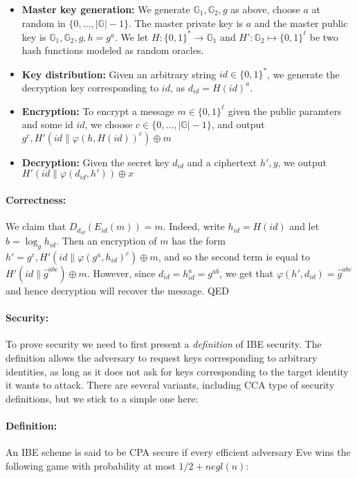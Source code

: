 \begin{itemize}
\item
  \textbf{Master key generation:} We generate
  \(\mathbb{G}_1,\mathbb{G}_2,g\) as above, choose \(a\) at random in
  \(\{0,\ldots,|\mathbb{G}|-1\}\). The master private key is \(a\) and
  the master public key is \(\mathbb{G}_1,\mathbb{G}_2,g,h=g^a\). We let
  \(H:\{0,1\}^*\rightarrow\mathbb{G}_1\) and
  \(H':\mathbb{G}_2\mapsto\{0,1\}^\ell\) be two hash functions modeled
  as random oracles.
\item
  \textbf{Key distribution:} Given an arbitrary string
  \(id\in\{0,1\}^*\), we generate the decryption key corresponding to
  \(id\), as \(d_{id} = H(id)^a\).
\item
  \textbf{Encryption:} To encrypt a message \(m\in\{0,1\}^\ell\) given
  the public paramters and some id \(id\), we choose
  \(c\in \{0,\ldots,|\mathbb{G}|-1\}\), and output
  \(g^c,H'(id\|\varphi(h,H(id))^c) \oplus m\)
\item
  \textbf{Decryption:} Given the secret key \(d_{id}\) and a ciphertext
  \(h',y\), we output \(H'(id\|\varphi(d_{id},h'))\oplus x\)
\end{itemize}

\paragraph{Correctness:} We claim that \(D_{d_{id}}(E_{id}(m))=m\).
Indeed, write \(h_{id}=H(id)\) and let \(b=\log_g h_{id}\). Then an
encryption of \(m\) has the form
\(h'=g^c, H'(id\|\varphi(g^a,h_{id})^c) \oplus m\), and so the second
term is equal to \(H'(id\|\hat{g}^{abc}) \oplus m\). However, since
\(d_{id}= h_{id}^a = g^{ab}\), we get that
\(\varphi(h',d_{id})=\hat{g}^{abc}\) and hence decryption will recover
the message. QED

\paragraph{Security:} To prove security we need to first present a
\emph{definition} of IBE security. The definition allows the adversary
to request keys corresponding to arbitrary identities, as long as it
does not ask for keys corresponding to the target identity it wants to
attack. There are several variants, including CCA type of security
definitions, but we stick to a simple one here:

\paragraph{Definition:} An IBE scheme is said to be CPA secure if every
efficient adversary Eve wins the following game with probability at most
\(1/2+ negl(n)\):

